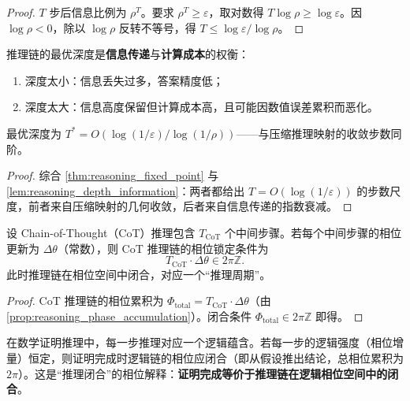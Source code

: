 \begin{proof}
$T$ 步后信息比例为 $\rho^T$。要求 $\rho^T\ge\varepsilon$，取对数得 $T\log\rho\ge\log\varepsilon$。因 $\log\rho<0$，除以 $\log\rho$ 反转不等号，得 $T\le\log\varepsilon/\log\rho$。
\end{proof}

\begin{corollary}[推理链的最优深度]\label{cor:optimal_reasoning_depth}
推理链的最优深度是\textbf{信息传递}与\textbf{计算成本}的权衡：
\begin{enumerate}[label=(\roman*)]
    \item 深度太小：信息丢失过多，答案精度低；
    \item 深度太大：信息高度保留但计算成本高，且可能因数值误差累积而恶化。
\end{enumerate}
最优深度为 $T^*=O(\log(1/\varepsilon)/\log(1/\rho))$——与压缩推理映射的收敛步数同阶。
\end{corollary}

\begin{proof}
综合 \cref{thm:reasoning_fixed_point} 与 \cref{lem:reasoning_depth_information}：两者都给出 $T=O(\log(1/\varepsilon))$ 的步数尺度，前者来自压缩映射的几何收敛，后者来自信息传递的指数衰减。
\end{proof}

\begin{theorem}\label{thm:cot_phase_locking}
设 Chain-of-Thought（CoT）推理包含 $T_{\text{CoT}}$ 个中间步骤。若每个中间步骤的相位更新为 $\Delta\theta$（常数），则 CoT 推理链的相位锁定条件为
\[
T_{\text{CoT}}\cdot\Delta\theta\in2\pi\mathbb{Z}.
\]
此时推理链在相位空间中闭合，对应一个“推理周期”。
\end{theorem}

\begin{proof}
CoT 推理链的相位累积为 $\Phi_{\text{total}}=T_{\text{CoT}}\cdot\Delta\theta$（由 \cref{prop:reasoning_phase_accumulation}）。闭合条件 $\Phi_{\text{total}}\in2\pi\mathbb{Z}$ 即得。
\end{proof}

\begin{example}[数学证明的相位结构]\label{ex:math_proof_phase}
在数学证明推理中，每一步推理对应一个逻辑蕴含。若每一步的逻辑强度（相位增量）恒定，则证明完成时逻辑链的相位应闭合（即从假设推出结论，总相位累积为 $2\pi$）。这是“推理闭合”的相位解释：\textbf{证明完成等价于推理链在逻辑相位空间中的闭合}。
\end{example}

